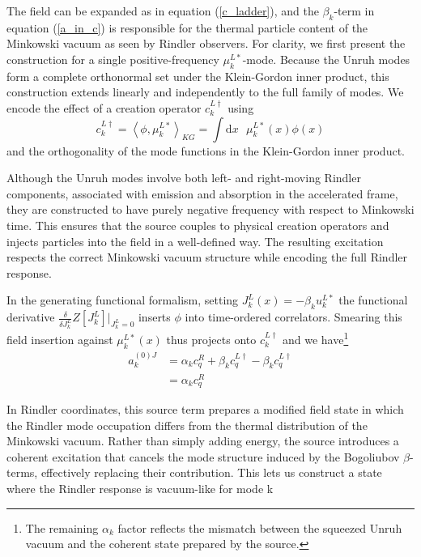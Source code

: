 \documentclass[12pt,a4paper]{article}
\newcommand{\dv}[1]{\mathrm{d} #1 \text{ }}
\begin{document}
The field can be expanded as in equation (\ref{c_ladder}), and the $\beta_k$-term in equation (\ref{a_in_c}) is responsible for the thermal particle content of the Minkowski vacuum as seen by Rindler observers. For clarity, we first present the construction for a single positive-frequency $\mu^{L*}_k$-mode. Because the Unruh modes form a complete orthonormal set under the Klein-Gordon inner product, this construction extends linearly and independently to the full family of modes. We encode the effect of a creation operator $c_k^{L \dagger}$ using
\begin{equation}
  c _k^{L\dagger} = \left<\phi, \mu_k^{L*}\right>_{KG} = \int \dv{x} \mu_k^{L*}(x) \phi(x)
\end{equation}
and the orthogonality of the mode functions in the Klein-Gordon inner product.

Although the Unruh modes involve both left- and right-moving Rindler components, associated with emission and absorption in the accelerated frame, they are constructed to have purely negative frequency with respect to Minkowski time. This ensures that the source couples to physical creation operators and injects particles into the field in a well-defined way. The resulting excitation respects the correct Minkowski vacuum structure while encoding the full Rindler response.

In the generating functional formalism, setting $J_k^L(x) = -\beta_k u_k^{L*}$ the functional derivative $\frac{\delta}{\delta J_k^L}Z[J_k^L]|_{J_k^L=0}$ inserts $\phi$ into time-ordered correlators. Smearing this field insertion against $\mu_k^{L*}(x)$ thus projects onto $c_k^{L\dagger}$ and we have\footnote{The remaining $\alpha_k$ factor reflects the mismatch between the squeezed Unruh vacuum and the coherent state prepared by the source.}
\begin{equation}
\begin{array}{ll}
  a_k^{(0)J} &= \alpha_k c_q^R + \beta_k c_q^{L\dagger} -  \beta_k c_q^{L\dagger} \\
  &= \alpha_k c_q^R
\end{array}
\end{equation}

In Rindler coordinates, this source term prepares a modified field state in which the Rindler mode occupation differs from the thermal distribution of the Minkowski vacuum. Rather than simply adding energy, the source introduces a coherent excitation that cancels the mode structure induced by the Bogoliubov $\beta$-terms, effectively replacing their contribution. This lets us construct a state where the Rindler response is vacuum-like for mode k
\end{document}
